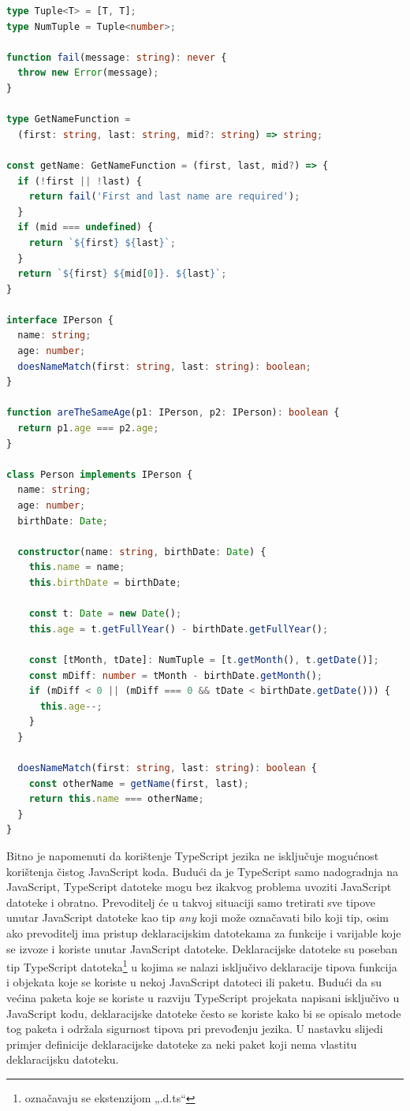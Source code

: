 \documentclass[times, utf8, diplomski, numeric]{fer}
\newcommand{\razmakp}{\vspace{18pt}}
\newcommand{\razmaks}{\vspace{10pt}}
\begin{document}
\razmakp %
\begin{lstlisting}[language=TypeScript, caption={Primjer definiranja i korištenja TypeScript tipova}, label={lst:typescript}]
type Tuple<T> = [T, T];
type NumTuple = Tuple<number>;

function fail(message: string): never {
  throw new Error(message);
}

type GetNameFunction =
  (first: string, last: string, mid?: string) => string;

const getName: GetNameFunction = (first, last, mid?) => {
  if (!first || !last) {
    return fail('First and last name are required');
  }
  if (mid === undefined) {
    return `${first} ${last}`;
  }
  return `${first} ${mid[0]}. ${last}`;
}

interface IPerson {
  name: string;
  age: number;
  doesNameMatch(first: string, last: string): boolean;
}

function areTheSameAge(p1: IPerson, p2: IPerson): boolean {
  return p1.age === p2.age;
}

class Person implements IPerson {
  name: string;
  age: number;
  birthDate: Date;

  constructor(name: string, birthDate: Date) {
    this.name = name;
    this.birthDate = birthDate;
  
    const t: Date = new Date();
    this.age = t.getFullYear() - birthDate.getFullYear();

    const [tMonth, tDate]: NumTuple = [t.getMonth(), t.getDate()];
    const mDiff: number = tMonth - birthDate.getMonth();
    if (mDiff < 0 || (mDiff === 0 && tDate < birthDate.getDate())) {
      this.age--;
    }
  }

  doesNameMatch(first: string, last: string): boolean {
    const otherName = getName(first, last);
    return this.name === otherName;
  }
}

\end{lstlisting}
\razmaks

Bitno je napomenuti da korištenje TypeScript jezika ne isključuje mogućnost korištenja čistog JavaScript koda.
Budući da je TypeScript samo nadogradnja na JavaScript, TypeScript datoteke mogu bez ikakvog problema uvoziti  JavaScript datoteke i obratno.
Prevoditelj će u takvoj situaciji samo tretirati sve tipove unutar JavaScript datoteke kao tip \emph{any} koji može označavati bilo koji tip, osim ako prevoditelj ima pristup deklaracijskim datotekama  za funkcije i varijable koje se izvoze  i koriste unutar JavaScript datoteke.
Deklaracijske datoteke su poseban tip TypeScript datoteka\footnote{označavaju se ekstenzijom „.d.ts“} u kojima se nalazi isključivo deklaracije tipova funkcija i objekata koje se koriste u nekoj JavaScript datoteci ili paketu.\citep{ts_hand}
Budući da su većina paketa koje se koriste u razviju TypeScript projekata napisani isključivo u JavaScript kodu, deklaracijske datoteke često se koriste kako bi se opisalo metode tog paketa i održala sigurnost tipova pri prevođenju jezika.
U nastavku slijedi primjer definicije deklaracijske datoteke za neki paket koji nema vlastitu deklaracijsku datoteku.
\end{document}
